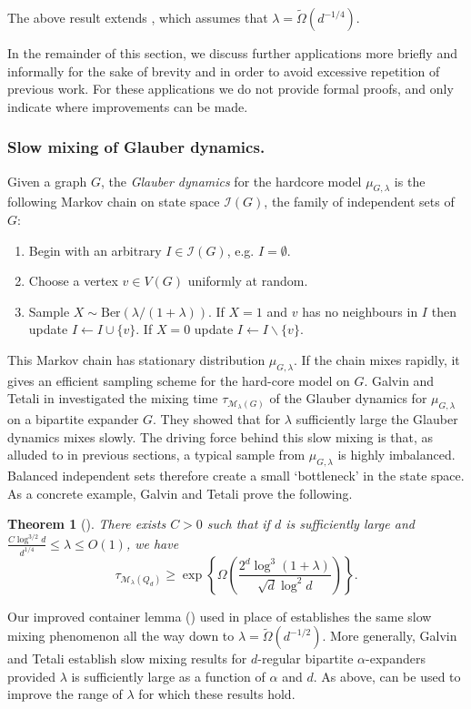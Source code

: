 \documentclass[10pt,a4paper]{amsart}
\newtheorem{thm}{Theorem}[section]
\theoremstyle{definition}
\newcommand{\cI}{\mathcal{I} }
\newcommand{\cM}{\mathcal{M} }
\newcommand{\nin}[0]{\noindent}
\newcommand{\0}[0]{\emptyset}
\newcommand{\lam}{\lambda}
\begin{document}
\nin The above result extends \cite[Theorem 2]{jenssen2023approximately}, which assumes that $\lam=\tilde \Omega(d^{-1/4})$. 

In the remainder of this section, we discuss further applications more briefly and informally {for the sake of brevity and in order to avoid excessive} repetition of previous work. For these applications we do not provide formal proofs, and only indicate where improvements can be made.

\subsubsection*{Slow mixing of Glauber dynamics.} Given a graph $G$, the \emph{Glauber dynamics} for the hardcore model $\mu_{G,\lam}$ is the following Markov chain on state space $\cI(G)$, the family of independent sets of $G$:
\begin{enumerate}
\item Begin with an arbitrary $I\in\cI(G)$, e.g. $I=\emptyset$.
\item Choose a vertex $v\in V(G)$ uniformly at random.
\item {Sample} $X\sim \text{Ber}(\lam/(1+\lam))$. If $X=1$ and $v$ has no neighbours in $I$ then update $I\leftarrow I\cup \{v\}$. If $X=0$ update $I\leftarrow I\backslash \{v\}$.
\end{enumerate}
This Markov chain has stationary distribution $\mu_{G,\lam}$. If the chain mixes rapidly, it gives an efficient sampling scheme for the hard-core model on $G$. Galvin and Tetali in \cite{galvin2006slow} investigated the mixing time $\tau_{\cM_{\lam}(G)}$ of the Glauber dynamics for $\mu_{G,\lam}$ on a bipartite expander $G$. They showed that for $\lam$ sufficiently large the Glauber dynamics mixes slowly. The driving force behind this slow mixing is that, as alluded to in previous sections, a typical sample from $\mu_{G,\lam}$ is highly imbalanced. Balanced independent sets therefore create a small `bottleneck' in the state space. As a concrete example, Galvin and Tetali prove the following. 

\begin{thm}[{\cite[Corollary 1.4]{galvin2006slow}}] 
    There exists $C>0$ such that if $d$ is sufficiently large and $\frac{C\log^{3/2} d}{d^{1/4}}\leq \lam\leq O(1)$, we have
    \[ \tau_{\cM_\lam (Q_d)} \geq \exp\left\{\Omega\left(\frac{2^d \log^3(1+\lam)}{\sqrt{d}\log^2 d} \right)\right\}.\]
\end{thm}

Our improved container lemma () used in place of \cite[Theorem 2.1]{galvin2006slow}
establishes the same slow mixing phenomenon all the way down to $\lam=\tilde \Omega(d^{-1/2})$. More generally, Galvin and Tetali establish slow mixing results for $d$-regular bipartite $\alpha$-expanders provided $\lam$ is sufficiently large as a function of $\alpha$ and $d$. As above,  can be used to improve the range of $\lam$ for which these results hold.
\end{document}
